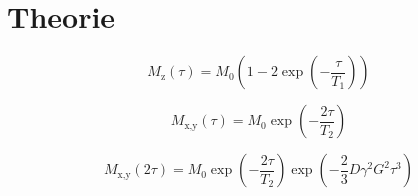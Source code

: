 \section{Theorie}
\label{sec:Theorie}

\begin{equation}
    M_\text{z}\left(\tau\right) = M_0 \left(1-2\exp{\left(-\frac{\tau}{T_1}\right)}\right)
    \label{eqn:SGR}
\end{equation}

\begin{equation}
    M_\text{x,y} \left(\tau\right) = M_0 \exp{\left(-\frac{2\tau}{T_2}\right)}
    \label{eqn:MGM}
\end{equation}

\begin{equation}
    M_\text{x,y} \left(2\tau\right) = M_0 \exp{\left(-\frac{2\tau}{T_2}\right)} \exp{\left(-\frac{2}{3}D\gamma^2G^2\tau^3\right)} 
    \label{eqn:DK}
\end{equation}
